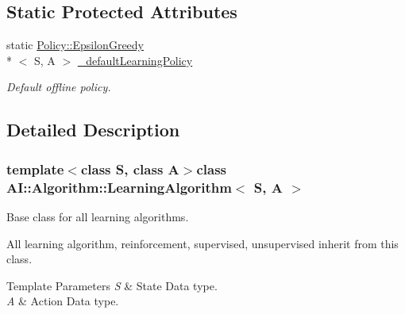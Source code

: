 \subsection*{Static Protected Attributes}
\begin{DoxyCompactItemize}
\item 
\hypertarget{classAI_1_1Algorithm_1_1LearningAlgorithm_ad9b3db3c2443e1a44803ec6d34887485}{static \hyperlink{classAI_1_1Algorithm_1_1Policy_1_1EpsilonGreedy}{Policy\-::\-Epsilon\-Greedy}\\*
$<$ S, A $>$ \hyperlink{classAI_1_1Algorithm_1_1LearningAlgorithm_ad9b3db3c2443e1a44803ec6d34887485}{\-\_\-default\-Learning\-Policy}}\label{classAI_1_1Algorithm_1_1LearningAlgorithm_ad9b3db3c2443e1a44803ec6d34887485}

\begin{DoxyCompactList}\small\item\em Default offline policy. \end{DoxyCompactList}\end{DoxyCompactItemize}


\subsection{Detailed Description}
\subsubsection*{template$<$class S, class A$>$class A\-I\-::\-Algorithm\-::\-Learning\-Algorithm$<$ S, A $>$}

Base class for all learning algorithms. 

All learning algorithm, reinforcement, supervised, unsupervised inherit from this class. 
\begin{DoxyTemplParams}{Template Parameters}
{\em S} & State Data type. \\
\hline
{\em A} & Action Data type. \\
\hline
\end{DoxyTemplParams}


